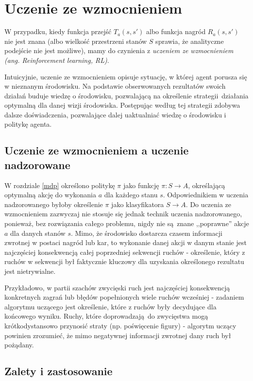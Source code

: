 \section{Uczenie ze wzmocnieniem}

W przypadku, kiedy funkcja przejść $T_a(s,s')$ albo funkcja nagród $R_a(s,s')$ nie jest znana (albo wielkość przestrzeni stanów $S$ sprawia, że analityczne podejście nie jest możliwe), mamy do czynienia z \textit{uczeniem ze wzmocnieniem (ang. Reinforcement learning, RL)}.

Intuicyjnie, uczenie ze wzmocnieniem opisuje sytuację, w której agent porusza się w nieznanym środowisku. Na podstawie obserwowanych rezultatów swoich działań buduje wiedzę o środowisku, pozwalającą na określenie strategii działania optymalną dla danej wizji środowiska. Postępując według tej strategii zdobywa dalsze doświadczenia, pozwalające dalej uaktualniać wiedzę o środowisku i politykę agenta.

\subsection{Uczenie ze wzmocnieniem a uczenie nadzorowane}
W rozdziale \ref{mdp} określono politykę $\pi$ jako funkcję $\pi: S \rightarrow A$, określającą optymalną akcję do wykonania $a$ dla każdego stanu $s$. Odpowiednikiem w uczenia nadzorowanego byłoby określenie $\pi$ jako klasyfikatora $S \rightarrow A$. Do uczenia ze wzmocnieniem zazwyczaj nie stosuje się jednak technik uczenia nadzorowanego, ponieważ, bez rozwiązania całego problemu, nigdy nie są znane ,,poprawne'' akcje $a$ dla danych stanów $s$. Mimo, że środowisko dostarcza czasem informacji zwrotnej w postaci nagród lub kar, to wykonanie danej akcji w danym stanie jest najczęściej konsekwencją całej poprzedniej sekwencji ruchów - określenie, który z ruchów w sekwencji był faktycznie kluczowy dla uzyskania określonego rezultatu jest nietrywialne.

Przykładowo, w partii szachów zwycięski ruch jest najczęściej konsekwencją konkretnych zagrań lub błędów popełnionych wiele ruchów wcześniej - zadaniem algorytmu uczącego jest określenie, które z ruchów były decydujące dla końcowego wyniku. Ruchy, które doprowadzają do zwycięstwa mogą krótkodystansowo przynosić straty (np. poświęcenie figury) - algorytm uczący powinien zrozumieć, że mimo negatywnej informacji zwrotnej dany ruch był pożądany.

\subsection{Zalety i zastosowanie}

